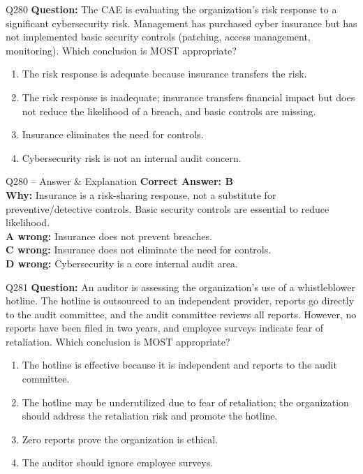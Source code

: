 \documentclass[aspectratio=169,10pt]{beamer}
\begin{document}
	\begin{frame}[t]{Q280}
		\small
		\textbf{Question:} The CAE is evaluating the organization's risk response to a significant cybersecurity risk. Management has purchased cyber insurance but has not implemented basic security controls (patching, access management, monitoring). Which conclusion is MOST appropriate?
		\begin{enumerate}[label=\Alph*.,itemsep=1pt,topsep=2pt]
			\item The risk response is adequate because insurance transfers the risk.
			\item The risk response is inadequate; insurance transfers financial impact but does not reduce the likelihood of a breach, and basic controls are missing.
			\item Insurance eliminates the need for controls.
			\item Cybersecurity risk is not an internal audit concern.
		\end{enumerate}
	\end{frame}
	
	\begin{frame}[t]{Q280 -- Answer \& Explanation}
		\small
		\textbf{Correct Answer: B} \\[4pt]
		\textbf{Why:} Insurance is a risk-sharing response, not a substitute for preventive/detective controls. Basic security controls are essential to reduce likelihood. \\[4pt]
		\textbf{A wrong:} Insurance does not prevent breaches. \\[2pt]
		\textbf{C wrong:} Insurance does not eliminate the need for controls. \\[2pt]
		\textbf{D wrong:} Cybersecurity is a core internal audit area.
	\end{frame}
	
	\begin{frame}[t]{Q281}
		\small
		\textbf{Question:} An auditor is assessing the organization's use of a whistleblower hotline. The hotline is outsourced to an independent provider, reports go directly to the audit committee, and the audit committee reviews all reports. However, no reports have been filed in two years, and employee surveys indicate fear of retaliation. Which conclusion is MOST appropriate?
		\begin{enumerate}[label=\Alph*.,itemsep=1pt,topsep=2pt]
			\item The hotline is effective because it is independent and reports to the audit committee.
			\item The hotline may be underutilized due to fear of retaliation; the organization should address the retaliation risk and promote the hotline.
			\item Zero reports prove the organization is ethical.
			\item The auditor should ignore employee surveys.
		\end{enumerate}
	\end{frame}
	
\end{document}
